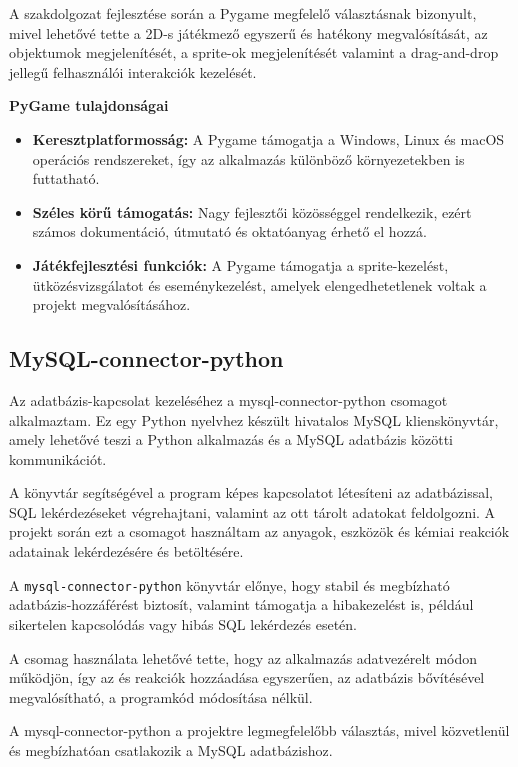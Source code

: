 \documentclass[]{thesis-ekf}
\begin{document}
	A szakdolgozat fejlesztése során a Pygame megfelelő választásnak bizonyult, mivel lehetővé tette a 2D-s játékmező egyszerű és hatékony megvalósítását, az objektumok megjelenítését, a sprite-ok megjelenítését valamint a drag-and-drop jellegű felhasználói interakciók kezelését.
	
	
	\textbf{PyGame tulajdonságai}
	\begin{itemize}
		\item \textbf{Keresztplatformosság:} A Pygame támogatja a Windows, Linux és macOS operációs rendszereket, így az alkalmazás különböző környezetekben is futtatható.
		
		\item \textbf{Széles körű támogatás:} Nagy fejlesztői közösséggel rendelkezik, ezért számos dokumentáció, útmutató és oktatóanyag érhető el hozzá.
		
		\item \textbf{Játékfejlesztési funkciók:} A Pygame támogatja a sprite-kezelést, ütközésvizsgálatot és eseménykezelést, amelyek elengedhetetlenek voltak a projekt megvalósításához.
	\end{itemize}
	
	\subsection{MySQL-connector-python}
	
	Az adatbázis-kapcsolat kezeléséhez a mysql-connector-python\cite{Oracle} csomagot alkalmaztam. Ez egy Python nyelvhez készült hivatalos MySQL klienskönyvtár, amely lehetővé teszi a Python alkalmazás és a MySQL adatbázis közötti kommunikációt.
	
	A könyvtár segítségével a program képes kapcsolatot létesíteni az adatbázissal, SQL lekérdezéseket végrehajtani, valamint az ott tárolt adatokat feldolgozni. A projekt során ezt a csomagot használtam az anyagok, eszközök és kémiai reakciók adatainak lekérdezésére és betöltésére.
	
	A \texttt{mysql-connector-python} könyvtár előnye, hogy stabil és megbízható adatbázis-hozzáférést biztosít, valamint támogatja a hibakezelést is, például sikertelen kapcsolódás vagy hibás SQL lekérdezés esetén.
	
	A csomag használata lehetővé tette, hogy az alkalmazás adatvezérelt módon működjön, így az  és reakciók hozzáadása egyszerűen, az adatbázis bővítésével megvalósítható, a programkód  módosítása nélkül.
	
	A mysql-connector-python a projektre legmegfelelőbb választás, mivel közvetlenül és megbízhatóan csatlakozik a MySQL adatbázishoz.
	
\end{document}
